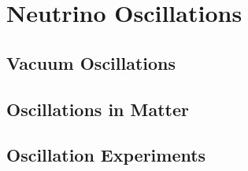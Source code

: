 \section{Neutrino Oscillations}
\label{sec:osc}


\subsection{Vacuum Oscillations}
\label{sec:VacOsc}


\subsection{Oscillations in Matter}
\label{sec:MSW}


\subsection{Oscillation Experiments}
\label{sec:OscExp}